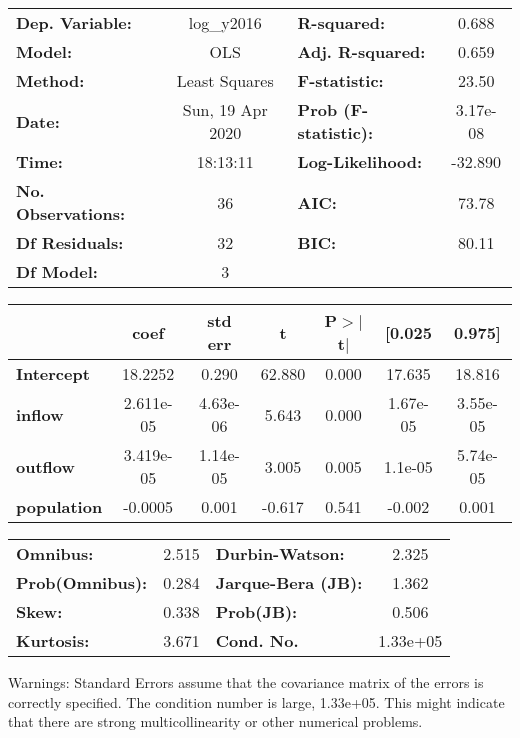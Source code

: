 \begin{center}
\begin{tabular}{lclc}
\toprule
\textbf{Dep. Variable:}    &    log\_y2016    & \textbf{  R-squared:         } &     0.688   \\
\textbf{Model:}            &       OLS        & \textbf{  Adj. R-squared:    } &     0.659   \\
\textbf{Method:}           &  Least Squares   & \textbf{  F-statistic:       } &     23.50   \\
\textbf{Date:}             & Sun, 19 Apr 2020 & \textbf{  Prob (F-statistic):} &  3.17e-08   \\
\textbf{Time:}             &     18:13:11     & \textbf{  Log-Likelihood:    } &   -32.890   \\
\textbf{No. Observations:} &          36      & \textbf{  AIC:               } &     73.78   \\
\textbf{Df Residuals:}     &          32      & \textbf{  BIC:               } &     80.11   \\
\textbf{Df Model:}         &           3      & \textbf{                     } &             \\
\bottomrule
\end{tabular}
\begin{tabular}{lcccccc}
                    & \textbf{coef} & \textbf{std err} & \textbf{t} & \textbf{P$> |$t$|$} & \textbf{[0.025} & \textbf{0.975]}  \\
\midrule
\textbf{Intercept}  &      18.2252  &        0.290     &    62.880  &         0.000        &       17.635    &       18.816     \\
\textbf{inflow}     &    2.611e-05  &     4.63e-06     &     5.643  &         0.000        &     1.67e-05    &     3.55e-05     \\
\textbf{outflow}    &    3.419e-05  &     1.14e-05     &     3.005  &         0.005        &      1.1e-05    &     5.74e-05     \\
\textbf{population} &      -0.0005  &        0.001     &    -0.617  &         0.541        &       -0.002    &        0.001     \\
\bottomrule
\end{tabular}
\begin{tabular}{lclc}
\textbf{Omnibus:}       &  2.515 & \textbf{  Durbin-Watson:     } &    2.325  \\
\textbf{Prob(Omnibus):} &  0.284 & \textbf{  Jarque-Bera (JB):  } &    1.362  \\
\textbf{Skew:}          &  0.338 & \textbf{  Prob(JB):          } &    0.506  \\
\textbf{Kurtosis:}      &  3.671 & \textbf{  Cond. No.          } & 1.33e+05  \\
\bottomrule
\end{tabular}
\end{center}

Warnings: \newline
 [1] Standard Errors assume that the covariance matrix of the errors is correctly specified. \newline
 [2] The condition number is large, 1.33e+05. This might indicate that there are \newline
 strong multicollinearity or other numerical problems.